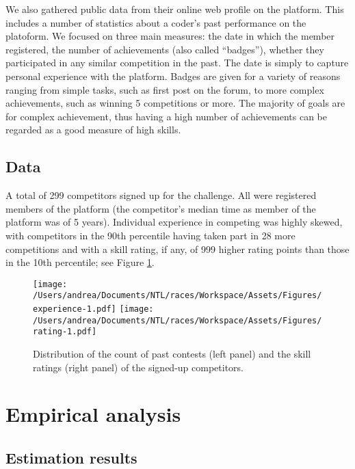 \documentclass[12pt, titlepage, draft]{article} \usepackage[utf8]{inputenc}                           \usepackage[english]{babel}                           \usepackage{amsmath,amssymb,amsfonts}                 \usepackage{xcolor,tikz,graphicx,subfig}              \usepackage{rotating,multirow,array,dcolumn,booktabs} \usepackage{natbib}                                   
\begin{document}
We also gathered public data from their online web profile on the
platform. This includes a number of statistics about a coder's past
performance on the platoform. We focused on three main measures: the
date in which the member registered, the number of achievements (also
called ``badges''), whether they participated in any similar competition
in the past. The date is simply to capture personal experience with the
platform. Badges are given for a variety of reasons ranging from simple
tasks, such as first post on the forum, to more complex achievements,
such as winning 5 competitions or more. The majority of goals are for
complex achievement, thus having a high number of achievements can be
regarded as a good measure of high skills.

\subsection{Data}\label{data}

A total of 299 competitors signed up for the challenge. All were
registered members of the platform (the competitor's median time as
member of the platform was of 5 years). Individual experience in
competing was highly skewed, with competitors in the 90th percentile
having taken part in 28 more competitions and with a skill rating, if
any, of 999 higher rating points than those in the 10th percentile; see
Figure \ref{eq: distribution experience}.

\begin{figure}
\centering
\texttt{[image:   /Users/andrea/Documents/NTL/races/Workspace/Assets/Figures/experience-1.pdf]}
\texttt{[image:   /Users/andrea/Documents/NTL/races/Workspace/Assets/Figures/rating-1.pdf]}
\caption{Distribution of the count of past contests (left panel) and the skill ratings (right panel) of the signed-up competitors.}
\label{eq: distribution experience}
\end{figure}

\section{Empirical analysis}\label{empirical-analysis}

\subsection{Estimation results}\label{estimation-results}
\end{document}
